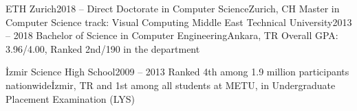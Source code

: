 \documentclass[main.tex]{subfiles}
\begin{document}
\olb
\olibig
{ETH Zurich}{2018 – }
{Direct Doctorate in Computer Science}{Zurich, CH}
{Master in Computer Science track: Visual Computing}
\olibig
{Middle East Technical University}{2013 – 2018}
{Bachelor of Science in Computer Engineering}{Ankara, TR}
{Overall GPA: 3.96/4.00, Ranked 2nd/190 in the department}
\begin{longversion}
\olibig
{İzmir Science High School}{2009 – 2013}
{Ranked 4th among 1.9 million participants nationwide}{İzmir, TR}
{and 1st among all students at METU, in Undergraduate Placement Examination (LYS)}
\end{longversion}
\ole
\end{document}
